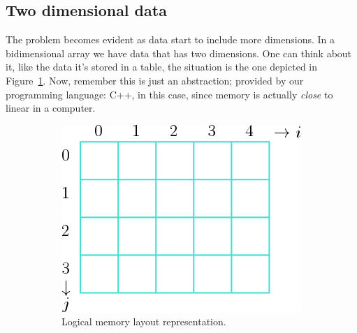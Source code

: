 \subsection{Two dimensional data}

The problem becomes evident as data start to include more dimensions.
In a bidimensional array we have data that has two dimensions.
One can think about it, like the data it's stored in a table, the situation is the one depicted in Figure~\ref{fig:2a}.
Now, remember this is just an abstraction; provided by our programming language: C++, in this case, since memory is actually \emph{close} to linear in a computer.

\begin{figure}[htp]
  \centering
  \begin{subfigure}[b]{0.35\textwidth}
    \includegraphics[width=\textwidth]{img/array2D}
    \caption{Logical memory layout representation.}
  \label{fig:2a}
  \end{subfigure}
  \hspace*{4cm}
  \begin{subfigure}[b]{0.25\textwidth}

\end{subfigure}
\end{figure}
